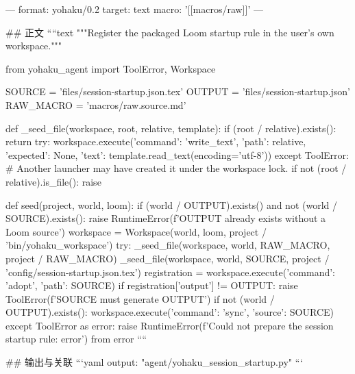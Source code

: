 ---
format: yohaku/0.2
target: text
macro: '[[macros/raw]]'
---

## 正文
````text
"""Register the packaged Loom startup rule in the user's own workspace."""

from yohaku_agent import ToolError, Workspace


SOURCE = 'files/session-startup.json.tex'
OUTPUT = 'files/session-startup.json'
RAW_MACRO = 'macros/raw.source.md'


def _seed_file(workspace, root, relative, template):
    if (root / relative).exists():
        return
    try:
        workspace.execute({'command': 'write_text', 'path': relative,
                           'expected': None, 'text': template.read_text(encoding='utf-8')})
    except ToolError:
        # Another launcher may have created it under the workspace lock.
        if not (root / relative).is_file():
            raise


def seed(project, world, loom):
    if (world / OUTPUT).exists() and not (world / SOURCE).exists():
        raise RuntimeError(f'{OUTPUT} already exists without a Loom source')
    workspace = Workspace(world, loom, project / 'bin/yohaku_workspace')
    try:
        _seed_file(workspace, world, RAW_MACRO, project / RAW_MACRO)
        _seed_file(workspace, world, SOURCE, project / 'config/session-startup.json.tex')
        registration = workspace.execute({'command': 'adopt', 'path': SOURCE})
        if registration['output'] != OUTPUT:
            raise ToolError(f'{SOURCE} must generate {OUTPUT}')
        if not (world / OUTPUT).exists():
            workspace.execute({'command': 'sync', 'source': SOURCE})
    except ToolError as error:
        raise RuntimeError(f'Could not prepare the session startup rule: {error}') from error
````

## 输出与关联
```yaml
output: "agent/yohaku_session_startup.py"
```
